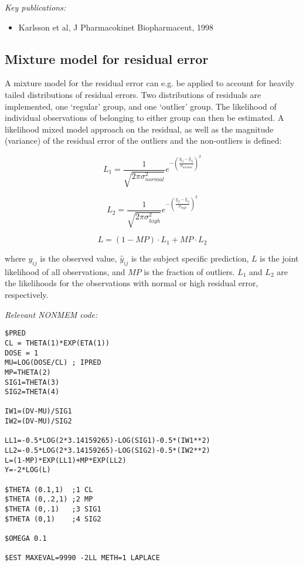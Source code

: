 \documentclass[a4paper,11pt]{article}
\begin{document}
\noindent \emph{Key publications:}
\begin{itemize}
\item Karlsson et al, J Pharmacokinet Biopharmaceut, 1998
\end{itemize}

\subsection{Mixture model for residual error}
A mixture model for the residual error can e.g. be applied to account
for heavily tailed distributions of residual errors. Two distributions
of residuals are implemented, one `regular' group, and one `outlier'
group. The likelihood of individual observations of belonging to
either group can then be estimated. A likelihood mixed model approach
on the residual, as well as the magnitude (variance) of the residual
error of the outliers and the non-outliers is defined:

\begin{equation}
L_1 = \frac{1}{\sqrt{2 \pi {\sigma^2_{normal}}}} e^{-{\left(\frac{y_{ij} - \hat{y}_{ij}}{\sigma_{normal}} \right)}^2}
\end{equation}

\begin{equation}
L_2 = \frac{1}{\sqrt{2 \pi {\sigma^2_{high}}}} e^{-{\left(\frac{y_{ij} - \hat{y}_{ij}}{\sigma_{high}} \right)}^2}
\end{equation}

\begin{equation}
L = (1-MP) \cdot L_1 + MP \cdot L_2
\end{equation}

where $y_{ij}$ is the observed value, $\hat{y}_{ij}$ is the subject specific prediction, $L$ is the joint
likelihood of all observations, and $MP$ is the fraction of outliers. $L_1$ and $L_2$ are the
likelihoods for the observations with normal or high residual error, respectively.

\noindent \emph{Relevant NONMEM code:}
\begin{lstlisting}
$PRED
CL = THETA(1)*EXP(ETA(1))
DOSE = 1
MU=LOG(DOSE/CL) ; IPRED
MP=THETA(2)
SIG1=THETA(3)
SIG2=THETA(4)

IW1=(DV-MU)/SIG1
IW2=(DV-MU)/SIG2

LL1=-0.5*LOG(2*3.14159265)-LOG(SIG1)-0.5*(IW1**2)
LL2=-0.5*LOG(2*3.14159265)-LOG(SIG2)-0.5*(IW2**2)
L=(1-MP)*EXP(LL1)+MP*EXP(LL2)
Y=-2*LOG(L)

$THETA (0.1,1)  ;1 CL
$THETA (0,.2,1) ;2 MP
$THETA (0,.1)   ;3 SIG1
$THETA (0,1)    ;4 SIG2

$OMEGA 0.1

$EST MAXEVAL=9990 -2LL METH=1 LAPLACE
\end{lstlisting}
\end{document}

